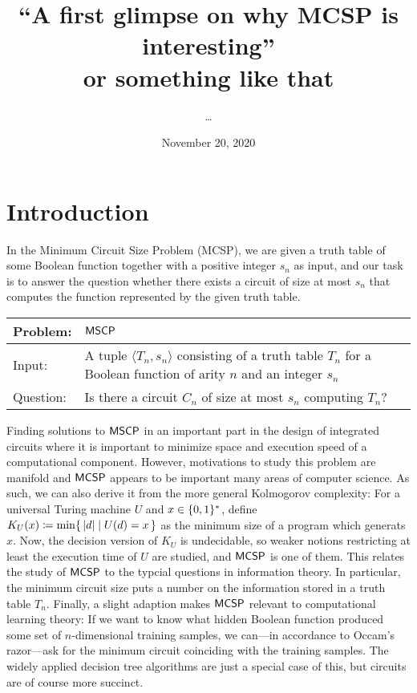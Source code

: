 \documentclass[11pt]{article}
\author{\dots}
\title{``A first glimpse on why MCSP is interesting''\\ or something like that}
\date{November 20, 2020}
\begin{document}
	\maketitle
	
\section{Introduction}

In the Minimum Circuit Size Problem (MCSP), we are given a truth table of some Boolean function together with a positive integer $s_n$ as input, and our task is to answer the question whether there exists a circuit of size at most $s_n$ that computes the function represented by the given truth table.

{
	\renewcommand{\arraystretch}{1.5}
	\begin{center}
		\begin{tabular}{|p{2cm}p{11cm}|}
			\hline
			Problem:
			&
			$\mathsf{MSCP}$
			\\
			\hline
			Input:
			&
			A tuple $\langle T_n, s_n \rangle$ consisting of a truth table $T_n$ for
			a Boolean function of arity $n$ and an integer $s_n$
			\\
			Question: & Is there a circuit $C_n$ of size at most $s_n$ computing $T_n$?
			\\
			\hline
		\end{tabular}
	\end{center}
}

Finding solutions to $\mathsf{MSCP}$ in an important part in the design
of integrated circuits where it is important to minimize space and execution
speed of a computational component.
However, motivations to study this problem are manifold and $\mathsf{MCSP}$
appears to be important many areas of computer science.
%
As such, we can also derive it from the more general Kolmogorov complexity:
For a universal Turing machine $U$ and $x \in \{0,1\}^*$, define
$K_U(x) \coloneqq \min \{\, { |d| \mid U(d) = x } \,\}$
as the minimum size of a program which generats $x$.
Now, the decision version of $K_U$ is undecidable, so weaker notions
restricting at least the execution time of $U$ are studied, and
$\mathsf{MCSP}$ is one of them.
%
%
This relates the study of $\mathsf{MCSP}$ to the typcial questions in
information theory. In particular, the minimum circuit size puts a number on
the information stored in a truth table $T_n$.
%
Finally, a slight adaption makes $\mathsf{MCSP}$ relevant to computational
learning theory:
If we want to know what hidden Boolean function produced some set of
$n$-dimensional training samples, we can---in accordance to Occam's razor---ask
for the minimum circuit coinciding with the training samples.
The widely applied decision tree algorithms are just a special case of this,
but circuits are of course more succinct.
\end{document}
